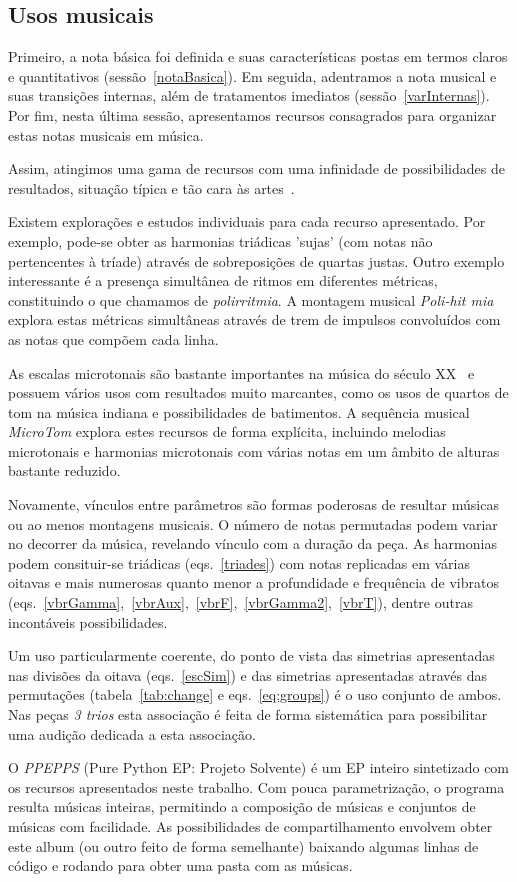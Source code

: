 \subsection{Usos musicais}

Primeiro, a nota básica foi definida e suas características postas em termos
claros e quantitativos (sessão~\ref{notaBasica}). Em seguida, adentramos a nota musical e suas transições internas,
além de tratamentos imediatos (sessão~\ref{varInternas}). Por fim, nesta última sessão, apresentamos
recursos consagrados para organizar estas notas musicais em música.

Assim, atingimos uma gama de recursos com uma infinidade de possibilidades de resultados,
situação típica e tão cara às artes~\cite{Harmonia,Webern}.

Existem explorações e estudos individuais para cada recurso apresentado. Por exemplo, pode-se obter as harmonias triádicas 'sujas' (com notas não pertencentes à tríade) através de sobreposições de quartas justas. Outro exemplo interessante é a presença simultânea de ritmos em diferentes métricas, constituindo o que chamamos de \emph{polirritmia}. A montagem musical \emph{Poli-hit mia} explora estas métricas simultâneas através de trem de impulsos convoluídos com as notas que compõem cada linha.

As escalas microtonais são bastante importantes na música do século XX~\cite{microtonalidade} e possuem vários usos com resultados muito marcantes, como os usos de quartos de tom na música indiana e possibilidades de batimentos. A sequência musical \emph{MicroTom} explora estes recursos de forma explícita, incluindo melodias microtonais e harmonias microtonais com várias notas em um âmbito de alturas bastante reduzido.

Novamente, vínculos entre parâmetros são formas poderosas de resultar músicas ou ao menos montagens musicais. O número de notas permutadas podem variar no decorrer da música, revelando vínculo com a duração da peça. As harmonias podem consituir-se triádicas (eqs.~\ref{triades}) com notas replicadas em várias oitavas e mais numerosas quanto menor a profundidade e frequência de vibratos (eqs.~\ref{vbrGamma},~\ref{vbrAux},~\ref{vbrF},~\ref{vbrGamma2},~\ref{vbrT}), dentre outras incontáveis possibilidades.

Um uso particularmente coerente, do ponto de vista das simetrias apresentadas nas divisões da oitava (eqs.~\ref{escSim}) e das simetrias apresentadas através das permutações (tabela~\ref{tab:change} e eqs.~\ref{eq:groups}) é o uso conjunto de ambos. Nas peças \emph{3 trios} esta associação é feita de forma sistemática para possibilitar uma audição dedicada a esta associação.

O \emph{PPEPPS} (Pure Python EP: Projeto Solvente) é um EP inteiro sintetizado com os recursos apresentados neste trabalho. Com pouca parametrização, o programa resulta músicas inteiras, permitindo a composição de músicas e conjuntos de músicas com facilidade. As possibilidades de compartilhamento envolvem obter este album (ou outro feito de forma semelhante) baixando algumas linhas de código e rodando para obter uma pasta com as músicas.


